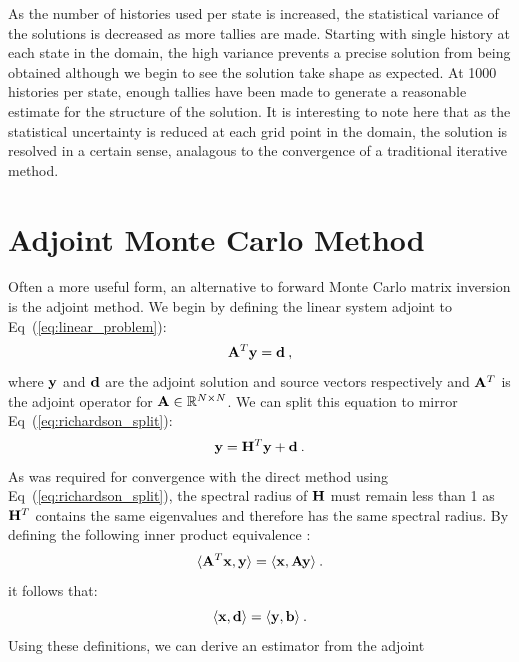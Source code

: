 As the number of histories used per state is increased, the
statistical variance of the solutions is decreased as more tallies are
made. Starting with single history at each state in the
domain, the high variance prevents a precise solution from being
obtained although we begin to see the solution take shape as
expected. At 1000 histories per state, enough tallies have been made
to generate a reasonable estimate for the structure of the
solution. It is interesting to note here that as the statistical
uncertainty is reduced at each grid point in the domain, the solution
is resolved in a certain sense, analagous to the convergence of a
traditional iterative method.
\clearpage

\section{Adjoint Monte Carlo Method}
\label{sec:adjoint_mc}
Often a more useful form, an alternative to forward Monte Carlo matrix
inversion is the adjoint method. We begin by defining the linear
system adjoint to Eq~(\ref{eq:linear_problem}):
\begin{equation}
  \mathbf{A}^T \mathbf{y} = \mathbf{d}\:,
  \label{eq:adjoint_linear_problem}
\end{equation}
where $\mathbf{y}$ and $\mathbf{d}$ are the adjoint solution and source
vectors respectively and $\mathbf{A}^T$ is the adjoint operator for
$\mathbf{A} \in \mathbb{R}^{N \times N}$. We can split this equation to
mirror Eq~(\ref{eq:richardson_split}):
\begin{equation}
  \mathbf{y} = \mathbf{H}^T \mathbf{y} + \mathbf{d}\:.
  \label{eq:adjoint_split_system}
\end{equation}
As was required for convergence with the direct method using
Eq~(\ref{eq:richardson_split}), the spectral radius of $\mathbf{H}$ must
remain less than 1 as $\mathbf{H}^T$ contains the same eigenvalues and
therefore has the same spectral radius. By defining the following
inner product equivalence \citep{spanier_monte_1969}:
\begin{equation}
  \langle \mathbf{A}^T \mathbf{x}, \mathbf{y} \rangle = \langle \mathbf{x}, \mathbf{A}
  \mathbf{y} \rangle\:.
  \label{eq:adjoint_operator_product}
\end{equation}
it follows that:
\begin{equation}
  \langle \mathbf{x}, \mathbf{d} \rangle = \langle \mathbf{y}, \mathbf{b} \rangle\:.
  \label{eq:adjoint_vector_relation}
\end{equation}
Using these definitions, we can derive an estimator from the adjoint
